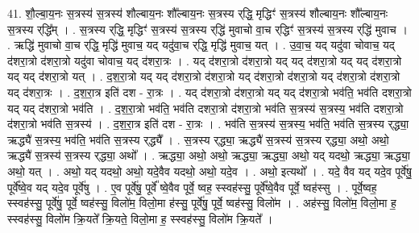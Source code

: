 \documentclass[17pt]{extarticle}
\begin{document}
41. शौ॒ल्बा॒य॒नः स॒त्रस्य॑ स॒त्रस्य॑ शौल्बाय॒नः शौ᳚ल्बाय॒नः स॒त्रस्य र्‌द्धि॒ मृद्धिꣳ॑ स॒त्रस्य॑ शौल्बाय॒नः शौ᳚ल्बाय॒नः स॒त्रस्य र्‌द्धि᳚म् । . स॒त्रस्य र्‌द्धि॒ मृद्धिꣳ॑ स॒त्रस्य॑ स॒त्रस्य र्‌द्धि॑ मुवाचो वा॒च र्‌द्धिꣳ॑ स॒त्रस्य॑ स॒त्रस्य र्‌द्धि॑ मुवाच । . ऋद्धि॑ मुवाचो वा॒च र्‌द्धि॒ मृद्धि॑ मुवाच॒ यद् यदु॑वा॒च र्‌द्धि॒ मृद्धि॑ मुवाच॒ यत् । . उ॒वा॒च॒ यद् यदु॑वा चोवाच॒ यद् द॑शरा॒त्रो द॑शरा॒त्रो यदु॑वा चोवाच॒ यद् द॑शरा॒त्रः । . यद् द॑शरा॒त्रो द॑शरा॒त्रो यद् यद् द॑शरा॒त्रो यद् यद् द॑शरा॒त्रो यद् यद् द॑शरा॒त्रो यत् । . द॒श॒रा॒त्रो यद् यद् द॑शरा॒त्रो द॑शरा॒त्रो यद् द॑शरा॒त्रो द॑शरा॒त्रो यद् द॑शरा॒त्रो द॑शरा॒त्रो यद् द॑शरा॒त्रः । . द॒श॒रा॒त्र इति॑ दश - रा॒त्रः । . यद् द॑शरा॒त्रो द॑शरा॒त्रो यद् यद् द॑शरा॒त्रो भव॑ति॒ भव॑ति दशरा॒त्रो यद् यद् द॑शरा॒त्रो भव॑ति । . द॒श॒रा॒त्रो भव॑ति॒ भव॑ति दशरा॒त्रो द॑शरा॒त्रो भव॑ति स॒त्रस्य॑ स॒त्रस्य॒ भव॑ति दशरा॒त्रो द॑शरा॒त्रो भव॑ति स॒त्रस्य॑ । . द॒श॒रा॒त्र इति॑ दश - रा॒त्रः । . भव॑ति स॒त्रस्य॑ स॒त्रस्य॒ भव॑ति॒ भव॑ति स॒त्रस्य र्‌द्ध्या॒ ऋद्ध्यै॑ स॒त्रस्य॒ भव॑ति॒ भव॑ति स॒त्रस्य र्‌द्ध्यै᳚ । . स॒त्रस्य र्‌द्ध्या॒ ऋद्ध्यै॑ स॒त्रस्य॑ स॒त्रस्य र्‌द्ध्या॒ अथो॒ अथो॒ ऋद्ध्यै॑ स॒त्रस्य॑ स॒त्रस्य र्‌द्ध्या॒ अथो᳚ । . ऋद्ध्या॒ अथो॒ अथो॒ ऋद्ध्या॒ ऋद्ध्या॒ अथो॒ यद् यदथो॒ ऋद्ध्या॒ ऋद्ध्या॒ अथो॒ यत् । . अथो॒ यद् यदथो॒ अथो॒ यदे॒वैव यदथो॒ अथो॒ यदे॒व । . अथो॒ इत्यथो᳚ । . यदे॒ वैव यद् यदे॒व पूर्वे॑षु॒ पूर्वे᳚ष्वे॒व यद् यदे॒व पूर्वे॑षु । . ए॒व पूर्वे॑षु॒ पूर्वे᳚ ष्वे॒वैव पूर्वे॒ ष्वह॒ स्स्वह॑स्सु॒ पूर्वे᳚ष्वे॒वैव पूर्वे॒ ष्वह॑स्सु । . पूर्वे॒ष्वह॒ स्स्वह॑स्सु॒ पूर्वे॑षु॒ पूर्वे॒ ष्वह॑स्सु॒ विलो॑म॒ विलो॒मा ह॑स्सु॒ पूर्वे॑षु॒ पूर्वे॒ ष्वह॑स्सु॒ विलो॑म । . अह॑स्सु॒ विलो॑म॒ विलो॒मा ह॒ स्स्वह॑स्सु॒ विलो॑म क्रि॒यते᳚ क्रि॒यते॒ विलो॒मा ह॒ स्स्वह॑स्सु॒ विलो॑म क्रि॒यते᳚ । \newline
\end{document}
